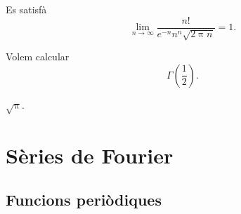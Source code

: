 \documentclass[../../main.tex]{subfiles}
\begin{document}
	\begin{corollary}
		\label{cor:fórmula d'Stirling}
		Es satisfà
		\[
		    \lim_{n\to\infty}\frac{n!}{e^{-n}n^{n}\sqrt{2\uppi n}}=1.
		\]
	\end{corollary}
	\begin{example}
		Volem calcular
		\[
		    \Gamma\left(\frac{1}{2}\right).
		\]
		\begin{solution}
			\(\sqrt{\uppi}\).
		\end{solution}
	\end{example}
\chapter{Sèries de Fourier}
\section{Funcions periòdiques}
\end{document}
